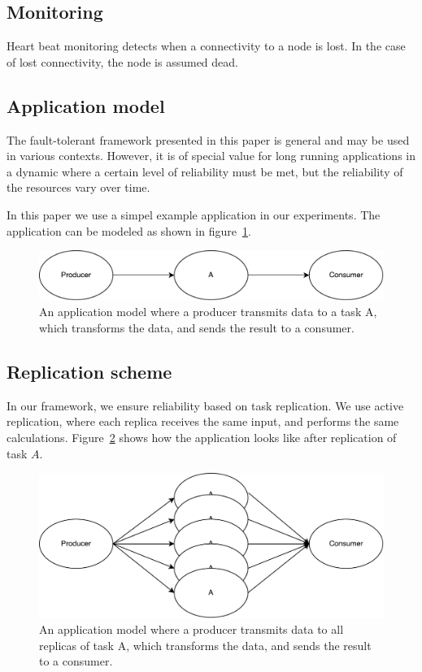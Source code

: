 \documentclass{cslthse-msc}
\begin{document}
\subsection{Monitoring}
Heart beat monitoring detects when a connectivity to a node is lost. In the case of lost connectivity, the node is assumed dead.

\subsection{Application model}
The fault-tolerant framework presented in this paper is general and may be used in various contexts. However, it is of special value for long running applications in a dynamic where a certain level of reliability must be met, but the reliability of the resources vary over time.

In this paper we use a simpel example application in our experiments. The application can be modeled as shown in figure~\ref{fig:app_model}.

\begin{figure}[!hbt]
\centering
\includegraphics[scale=0.5]{images/app_model.pdf} 
\caption{An application model where a producer transmits data to a task A, which transforms the data, and sends the result to a consumer.}\label{fig:app_model}
\end{figure}

\subsection{Replication scheme}
In our framework, we ensure reliability based on task replication. We use active replication, where each replica receives the same input, and performs the same calculations. Figure~\ref{fig:app_model_replication} shows how the application looks like after replication of task $A$.

\begin{figure}[!hbt]
\centering
\includegraphics[scale=0.5]{images/app_model_replication.pdf} 
\caption{An application model where a producer transmits data to all replicas of task A, which transforms the data, and sends the result to a consumer.}\label{fig:app_model_replication}
\end{figure}
\end{document}
